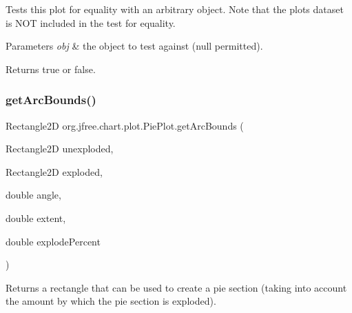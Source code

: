 Tests this plot for equality with an arbitrary object. Note that the plot\textquotesingle{}s dataset is N\+OT included in the test for equality.


\begin{DoxyParams}{Parameters}
{\em obj} & the object to test against ({\ttfamily null} permitted).\\
\hline
\end{DoxyParams}
\begin{DoxyReturn}{Returns}
{\ttfamily true} or {\ttfamily false}. 
\end{DoxyReturn}
\mbox{\label{classorg_1_1jfree_1_1chart_1_1plot_1_1_pie_plot_a4150859d588970b7c12ebce9583eb062}} 
\subsubsection{\texorpdfstring{get\+Arc\+Bounds()}{getArcBounds()}}
{\footnotesize\ttfamily Rectangle2D org.\+jfree.\+chart.\+plot.\+Pie\+Plot.\+get\+Arc\+Bounds (\begin{DoxyParamCaption}\item[{Rectangle2D}]{unexploded,  }\item[{Rectangle2D}]{exploded,  }\item[{double}]{angle,  }\item[{double}]{extent,  }\item[{double}]{explode\+Percent }\end{DoxyParamCaption})\hspace{0.3cm}{\ttfamily [protected]}}

Returns a rectangle that can be used to create a pie section (taking into account the amount by which the pie section is \textquotesingle{}exploded\textquotesingle{}).


